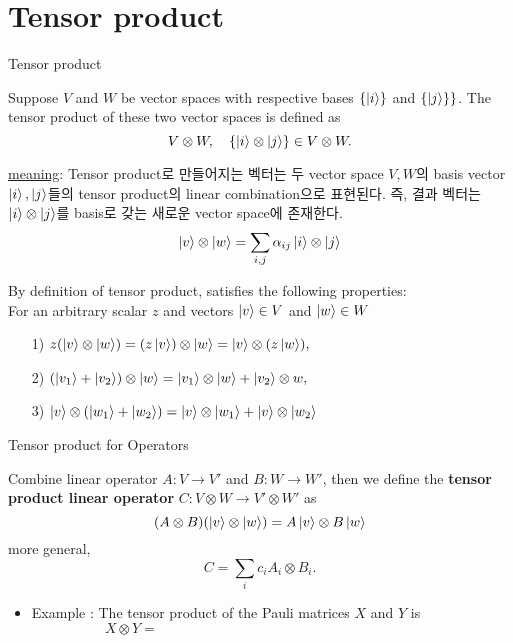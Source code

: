 \documentclass[9pt]{beamer}
\begin{document}
    \section{Tensor product}
    \begin{frame}{Tensor product}
        \begin{definition}
            Suppose $V$ and $W$ be vector spaces with respective bases $\{\ket i\}$ and $\{ \ket j \}\}$. The tensor product of these two vector spaces is defined as
            $$V \otimes W,\quad \{\ket i \otimes \ket j\}\in V\otimes W.$$
        \end{definition}

        \checkmark \underline{meaning}: Tensor product로 만들어지는 벡터는 두 vector space $V, W$의 basis vector$\ket i, \ket j$들의 tensor product의 linear combination으로 표현된다. 즉, 결과 벡터는 $\ket i \otimes \ket j$를 basis로 갖는 새로운 vector space에 존재한다. 
        $$\ket v \otimes \ket w = \sum_{i,j} \alpha_{ij} \ket i \otimes \ket j$$

        \vspace{0.3cm}
        By definition of tensor product, satisfies the following properties: \\ 
        For an arbitrary scalar $z$ and vectors $\ket v \in V$ and $\ket w \in W$
        \begin{itemize}
            \item[1)] $z(\ket v \otimes \ket w) = (z \ket v) \otimes \ket w = \ket v \otimes (z \ket w),$
            \item[2)] $(\ket{v_1} + \ket{v_2}) \otimes \ket w = \ket{v_1} \otimes \ket w + \ket{v_2} \otimes w,$
            \item[3)] $\ket v \otimes (\ket{w_1} + \ket{w_2}) = \ket v \otimes \ket{w_1} + \ket v \otimes \ket{w_2}$
        \end{itemize}
        
    \end{frame}

    \begin{frame}{Tensor product for Operators}
        \begin{definition}
            Combine linear operator $A : V \rightarrow V'$ and $B : W \rightarrow W'$, then we define the \textbf{tensor product linear operator} $C: V \otimes W \rightarrow V' \otimes W'$ as
            $$(A\otimes B) (\ket v \otimes \ket w) = A\ket v \otimes B \ket w$$
            more general,
            $$C = \sum_i c_i A_i \otimes B_i.$$
        \end{definition}
        \begin{itemize}
            \item Example : 
            The tensor product of the Pauli matrices $X$ and $Y$ is
            \vspace{0.5cm}
            $$X \otimes Y = \qquad \qquad \qquad \qquad \qquad \qquad  \qquad   \qquad   \qquad   \qquad $$
        \end{itemize}
    \end{frame}
\end{document}
